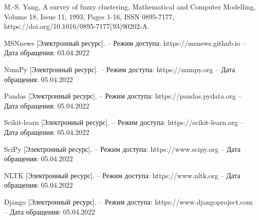 \begin{thebibliography}{}
	
	M.-S. Yang, A survey of fuzzy clustering, Mathematical and Computer Modelling, Volume 18, Issue 11, 1993, Pages 1-16, ISSN 0895-7177, https://doi.org/10.1016/0895-7177(93)90202-A.
	
	
	MSNnews [Электронный ресурс]. – Режим доступа: https://msnews.github.io – Дата
	обращения: 03.04.2022
	
	
	NumPy [Электронный ресурс]. – Режим доступа: https://numpy.org – Дата
	обращения: 05.04.2022
	
	
	Pandas [Электронный ресурс]. – Режим доступа:
	https://pandas.pydata.org – Дата обращения: 05.04.2022
	
	
	Scikit-learn [Электронный ресурс]. – Режим доступа:
	https://scikit-learn.org – Дата обращения: 05.04.2022
	
	
	SciPy [Электронный ресурс]. – Режим доступа: https://www.scipy.org –
	Дата обращения: 05.04.2022
	
	
	NLTK [Электронный ресурс]. – Режим доступа:
	https://www.nltk.org – Дата обращения: 05.04.2022
	
	
	Django [Электронный ресурс]. – Режим доступа:
	https://www.djangoproject.com – Дата обращения: 05.04.2022
	
	
\end{thebibliography}
\endgroup

